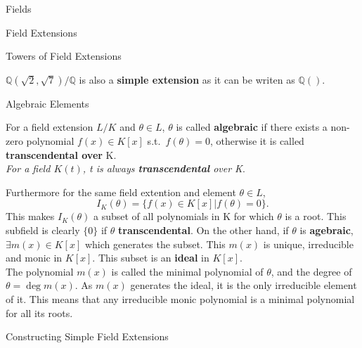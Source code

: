 \documentclass[12pt, letterpaper]{article}
\begin{document}
\begin{section}{Fields}
\begin{subsection}{Field Extensions}
\begin{subsubsection}{Towers of Field Extensions}
\begin{center}
      \end{center}
      \(\mathbb{Q}(\sqrt{2}, \sqrt{7}) / \mathbb{Q}\) is also a
      \textbf{simple extension} as it can be writen as \(\mathbb{Q}()\).

    \end{subsubsection}

  \end{subsection}

  \begin{subsection}{Algebraic Elements}

    For a field extension \(L / K\) and \(\theta \in L\), \(\theta\) is called
    \textbf{algebraic} if there exists a non-zero polynomial \(f(x) \in K[x]\)
    s.t.\ \(f(\theta) = 0\), otherwise it is called \textbf{transcendental
      over} K. \\
    \textit{For a field \(K(t)\), t is always \textbf{transcendental} over K}.

    Furthermore for the same field extention and element \(\theta \in L\),
    \[I_{K}(\theta) = \{f(x) \in K[x] | f(\theta) = 0\}.\] This makes
    \(I_{K}(\theta)\) a subset of all polynomials in K for which \(\theta\) is
    a root. This subfield is clearly \(\{ 0 \}\) if \(\theta\)
    \textbf{transcendental}. On the other hand, if \(\theta\) is
    \textbf{agebraic}, \(\exists m(x) \in K[x]\) which generates the subset.
    This \(m(x)\) is unique, irreducible and monic in \(K[x]\). This subset is
    an \textbf{ideal} in \(K[x]\). \\
    The polynomial \(m(x)\) is called the minimal polynomial of \(\theta\), and
    the degree of \(\theta = \deg m(x)\). As \(m(x)\) generates the ideal, it
    is the only irreducible element of it. This means that any irreducible
    monic polynomial is a minimal polynomial for all its roots.

  \end{subsection}

  \begin{subsection}{Constructing Simple Field Extensions}


\end{subsection}
\end{section}
\end{document}
